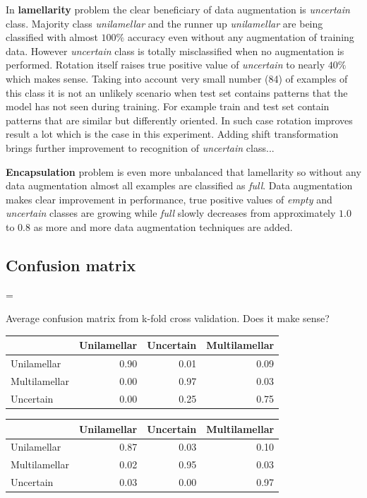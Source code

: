 \documentclass[a4paper, 11pt, table]{article}
\newenvironment{warning}
  {\par\begin{mdframed}[linewidth=2pt,linecolor=red]%
    \begin{list}{}{\leftmargin=1cm
                   \labelwidth=\leftmargin}\item[\Large\ding{43}]}
  {\end{list}\end{mdframed}\par}
\begin{document}
In \textbf{lamellarity} problem the clear beneficiary of data augmentation is \textit{uncertain} class. Majority  class \textit{unilamellar} and the runner up \textit{unilamellar} are being classified with almost $100\%$ accuracy even without any augmentation of training data. However \textit{uncertain} class is totally misclassified when no augmentation is performed. Rotation itself raises true positive value of \textit{uncertain} to nearly $40\%$ which makes sense. Taking into account very small number (84) of examples of this class it is not an unlikely scenario when test set contains patterns that the model has not seen during training. For example train and test set contain patterns that are similar but differently oriented. In such case rotation improves result a lot which is the case in this experiment. Adding shift transformation brings further improvement to recognition of \textit{uncertain} class...

\textbf{Encapsulation} problem is even more unbalanced that lamellarity so without any data augmentation almost all examples are classified as \textit{full}. Data augmentation makes clear improvement in performance, true positive values of \textit{empty} and \textit{uncertain} classes are growing while \textit{full} slowly decreases from approximately $1.0$ to $0.8$ as more and more data augmentation techniques are added. 


\subsection{Confusion matrix}

\begin{warning}
Average confusion matrix from k-fold cross validation. Does it make sense? 
\end{warning}

\begin{center}
\begin{tabular}{lrrr}
\hline
 & Unilamellar & Uncertain & Multilamellar \\ 
\hline 
Unilamellar & 0.90 & 0.01 & 0.09 \\ 
Multilamellar & 0.00 & 0.97 & 0.03 \\ 
Uncertain & 0.00 & 0.25 & 0.75 \\ 
\end{tabular} 
\end{center}

\begin{center}
\begin{tabular}{lrrr}
\hline
 & Unilamellar & Uncertain & Multilamellar \\ 
\hline 
Unilamellar & 0.87 & 0.03 & 0.10 \\ 
Multilamellar & 0.02 & 0.95 & 0.03 \\ 
Uncertain & 0.03 & 0.00 & 0.97 \\ 
\end{tabular} 
\end{center}
\end{document}
